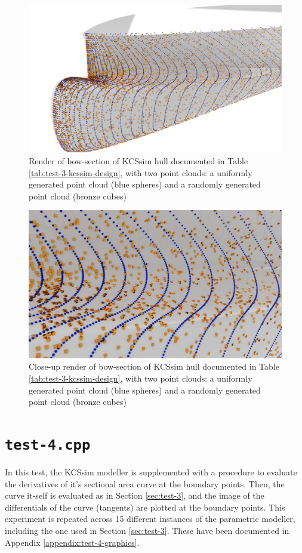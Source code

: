 \documentclass{report}
\begin{document}
\begin{figure}[H]
    \centering
    \includegraphics[width = 0.7\linewidth]{figures/test-3-kcssim-random-uniform-render.png}
    \caption{Render of bow-section of KCSsim hull documented in Table \ref{tab:test-3-kcssim-design},
    with two point clouds: a uniformly generated point cloud (blue spheres) and a randomly generated 
    point cloud (bronze cubes)}
    \label{fig:test-3-kcssim-random-uniform-render}
\end{figure}
\begin{figure}[H]
    \centering
    \includegraphics[width = 0.7\linewidth]{figures/test-3-kcssim-random-uniform-render-close-up.png}
    \caption{Close-up render of bow-section of KCSsim hull documented in Table \ref{tab:test-3-kcssim-design},
    with two point clouds: a uniformly generated point cloud (blue spheres) and a randomly generated 
    point cloud (bronze cubes)}
    \label{fig:test-3-kcssim-random-uniform-render-close-up}
\end{figure}

\section{\texttt{test-4.cpp}}

\newpar In this test, the KCSsim modeller is supplemented with a procedure 
to evaluate the derivatives of it's sectional area curve at the boundary
points. Then, the curve it-self is evaluated as in Section \ref{sec:test-3}, and the 
image of the differentials of the curve (tangents) are plotted at the 
boundary points. This experiment is repeated across 15 different instances of the 
parametric modeller, including the one used in Section \ref{sec:test-3}. These
have been documented in Appendix \ref{appendix:test-4-graphics}.
\end{document}
